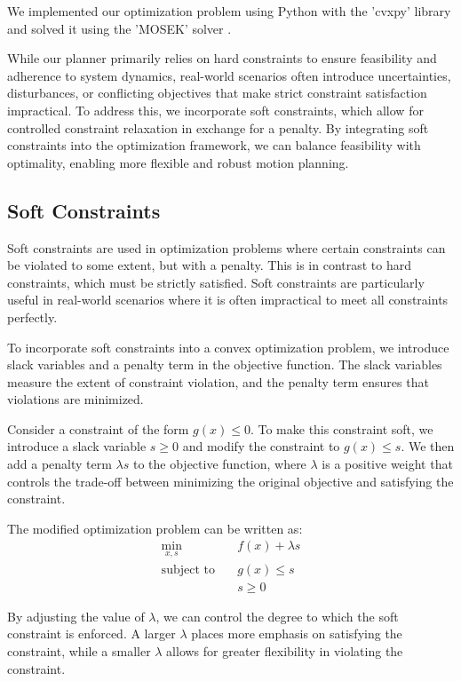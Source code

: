 We implemented our optimization problem using Python with the 'cvxpy' library and solved it using the 'MOSEK' solver \cite{diamond2016cvxpy}.

While our planner primarily relies on hard constraints to ensure feasibility and adherence to system dynamics, real-world scenarios often introduce
uncertainties, disturbances, or conflicting objectives that make strict constraint satisfaction impractical.
To address this, we incorporate soft constraints, which allow for controlled constraint relaxation in exchange for a penalty.
By integrating soft constraints into the optimization framework, we can balance feasibility with optimality, enabling more flexible and robust motion
planning.

\subsection{Soft Constraints}

Soft constraints are used in optimization problems where certain constraints can be violated to some extent, but with a penalty.
This is in contrast to hard constraints, which must be strictly satisfied.
Soft constraints are particularly useful in real-world scenarios where it is often impractical to meet all constraints perfectly.

To incorporate soft constraints into a convex optimization problem, we introduce slack variables and a penalty term in the objective function.
The slack variables measure the extent of constraint violation, and the penalty term ensures that violations are minimized.

Consider a constraint of the form \( g(x) \leq 0 \).
To make this constraint soft, we introduce a slack variable \( s \geq 0 \) and modify the constraint to \( g(x) \leq s \).
We then add a penalty term \( \lambda s \) to the objective function, where \( \lambda \) is a positive weight that controls the trade-off between
minimizing the original objective and satisfying the constraint.

The modified optimization problem can be written as:
\begin{align*}
	\min_{x, s} \quad       & f(x) + \lambda s \\
	\text{subject to} \quad & g(x) \leq s      \\
	                        & s \geq 0
\end{align*}

By adjusting the value of \( \lambda \), we can control the degree to which the soft constraint is enforced.
A larger \( \lambda \) places more emphasis on satisfying the constraint, while a smaller \( \lambda \) allows for greater flexibility in violating
the constraint.

